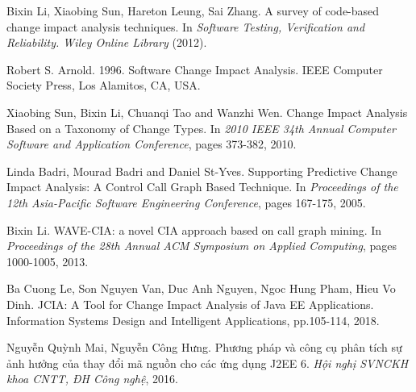 \documentclass[12pt]{report}
\begin{document}
\begin{thebibliography}{9}
	Bixin Li, Xiaobing Sun, Hareton Leung, Sai Zhang.
	A survey of code-based change impact analysis techniques.
	In \textit{Software Testing, Verification and Reliability. Wiley Online Library} (2012).
	
	Robert S. Arnold. 1996. Software Change Impact Analysis. IEEE Computer Society Press, Los Alamitos, CA, USA.
	
	Xiaobing Sun, Bixin Li, Chuanqi Tao and Wanzhi Wen. 
	Change Impact Analysis Based on a Taxonomy of Change Types. In \textit{2010 IEEE 34th Annual Computer Software and Application Conference}, pages 373-382, 2010. 
	
	Linda Badri, Mourad Badri and Daniel St-Yves. Supporting Predictive Change Impact Analysis: A Control Call Graph Based Technique. In \textit{Proceedings of the 12th Asia-Pacific Software Engineering Conference}, pages 167-175, 2005.
	
	Bixin Li. WAVE-CIA: a novel CIA approach based on call graph mining. In \textit{Proceedings of the 28th Annual ACM Symposium on Applied Computing}, pages 1000-1005, 2013.
	
	Ba Cuong Le, Son Nguyen Van, Duc Anh Nguyen, Ngoc Hung Pham, Hieu Vo Dinh. JCIA: A Tool for Change Impact Analysis of Java EE Applications. Information Systems Design and Intelligent Applications, pp.105-114, 2018.
	
	Nguyễn Quỳnh Mai, Nguyễn Công Hưng. Phương pháp và công cụ phân tích sự ảnh hưởng của thay đổi mã nguồn cho các ứng dụng J2EE 6. \textit{Hội nghị SVNCKH khoa CNTT, ĐH Công nghệ}, 2016.
\end{thebibliography}
\end{document}

